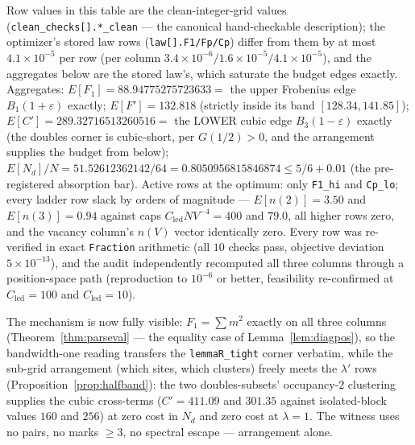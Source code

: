 \documentclass[11pt]{article}
\theoremstyle{plain}
\theoremstyle{definition}
\theoremstyle{remark}
\newcommand{\Cled}{C_{\mathrm{led}}}
\newcommand{\Nd}{N_{d}}
\begin{document}
Row values in this table are the clean-integer-grid values
(\texttt{clean\_checks[].*\_clean} --- the canonical hand-checkable description);
the optimizer's stored law rows (\texttt{law[].F1/Fp/Cp}) differ from them by at
most $4.1 \times 10^{-5}$ per row (per column
$3.4 \times 10^{-6} / 1.6 \times 10^{-5} / 4.1 \times 10^{-5}$), and the
aggregates below are the stored law's, which saturate the budget edges exactly.
Aggregates: $E[F_1] = 88.94775275723633 = $ the upper Frobenius edge
$B_1(1 + \varepsilon)$ exactly; $E[F'] = 132.818$ (strictly inside its band
$[128.34, 141.85]$); $E[C'] = 289.32716513260516 = $ the LOWER cubic edge
$B_3(1 - \varepsilon)$ exactly (the doubles corner is cubic-short, per
$G(1/2) > 0$, and the arrangement supplies the budget from below);
$E[\Nd]/N = 51.52612362142/64 = 0.8050956815846874 \le 5/6 + 0.01$ (the
pre-registered absorption bar). Active rows at the optimum: only
\texttt{F1\_hi} and \texttt{Cp\_lo}; every ladder row slack by orders of
magnitude --- $E[n(2)] = 3.50$ and $E[n(3)] = 0.94$ against caps
$\Cled N V^{-4} = 400$ and $79.0$, all higher rows zero, and the vacancy column's
$n(V)$ vector identically zero. Every row was re-verified in exact
\texttt{Fraction} arithmetic (all $10$ checks pass, objective deviation
$5 \times 10^{-13}$), and the audit independently recomputed all three columns
through a position-space path (reproduction to $10^{-6}$ or better, feasibility
re-confirmed at $\Cled = 100$ and $\Cled = 10$).

The mechanism is now fully visible: $F_1 = \sum m^2$ exactly on all three columns
(Theorem~\ref{thm:parseval} --- the equality case of
Lemma~\ref{lem:diagpos}), so the bandwidth-one reading transfers the
\texttt{lemmaR\_tight} corner verbatim, while the sub-grid arrangement (which
sites, which clusters) freely meets the $\lambda'$ rows
(Proposition~\ref{prop:halfband}): the two doubles-subsets' occupancy-$2$
clustering supplies the cubic cross-terms ($C' = 411.09$ and $301.35$ against
isolated-block values $160$ and $256$) at zero cost in $\Nd$ and zero cost at
$\lambda = 1$. The witness uses no pairs, no marks $\ge 3$, no spectral escape ---
arrangement alone.
\end{document}
